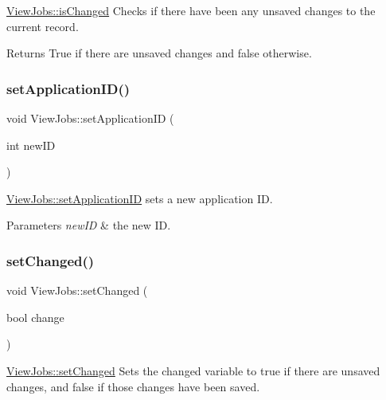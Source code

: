 \mbox{\hyperlink{class_view_jobs_a5f75b45d28ce7f4a8050ce9ce0f44350}{View\+Jobs\+::is\+Changed}} Checks if there have been any unsaved changes to the current record. 

\begin{DoxyReturn}{Returns}
True if there are unsaved changes and false otherwise. 
\end{DoxyReturn}
\mbox{\label{class_view_jobs_acd43a8c32ab9bca7e40ecc99e51da9b8}} 
\subsubsection{\texorpdfstring{set\+Application\+I\+D()}{setApplicationID()}}
{\footnotesize\ttfamily void View\+Jobs\+::set\+Application\+ID (\begin{DoxyParamCaption}\item[{int}]{new\+ID }\end{DoxyParamCaption})}



\mbox{\hyperlink{class_view_jobs_acd43a8c32ab9bca7e40ecc99e51da9b8}{View\+Jobs\+::set\+Application\+ID}} sets a new application ID. 


\begin{DoxyParams}{Parameters}
{\em new\+ID} & the new ID. \\
\hline
\end{DoxyParams}
\mbox{\label{class_view_jobs_a3cba868c6deadaf4b35c18982f7ec35e}} 
\subsubsection{\texorpdfstring{set\+Changed()}{setChanged()}}
{\footnotesize\ttfamily void View\+Jobs\+::set\+Changed (\begin{DoxyParamCaption}\item[{bool}]{change }\end{DoxyParamCaption})}



\mbox{\hyperlink{class_view_jobs_a3cba868c6deadaf4b35c18982f7ec35e}{View\+Jobs\+::set\+Changed}} Sets the changed variable to true if there are unsaved changes, and false if those changes have been saved. 


